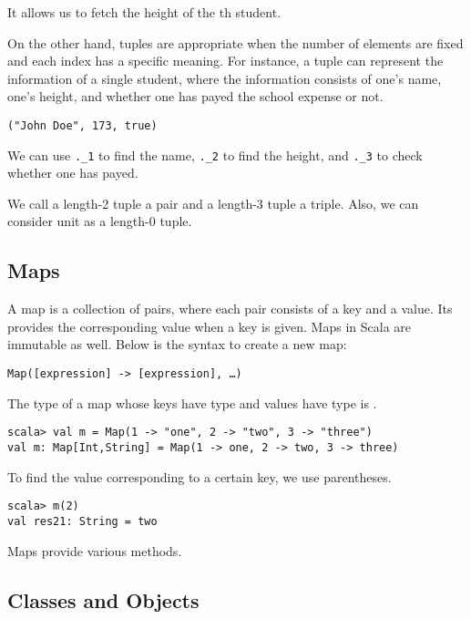 It allows us to fetch the height of the th student.

On the other hand, tuples are appropriate when the number of elements
are fixed and each index has a specific meaning. For instance,
a tuple can represent the information of a single student, where the information
consists of one's name, one's height, and whether one has payed the school
expense or not.

\begin{verbatim}
("John Doe", 173, true)
\end{verbatim}

We can use \verb+._1+ to find the name, \verb+._2+ to find the height, and
\verb+._3+ to check whether one has payed.

We call a length-2 tuple a pair and a length-3 tuple a triple. Also, we can
consider unit as a length-0 tuple.

\subsection{Maps}

A map is a collection of pairs, where each pair consists of a key and a value.
Its provides the corresponding value when a key is given.
Maps in Scala are immutable as well. Below is the syntax to create a new map:

\begin{verbatim}
Map([expression] -> [expression], …)
\end{verbatim}

The type of a map whose keys have type  and values have type  is
.

\begin{verbatim}
scala> val m = Map(1 -> "one", 2 -> "two", 3 -> "three")
val m: Map[Int,String] = Map(1 -> one, 2 -> two, 3 -> three)
\end{verbatim}

To find the value corresponding to a certain key, we use parentheses.

\begin{verbatim}
scala> m(2)
val res21: String = two
\end{verbatim}

Maps provide various
methods.

\subsection{Classes and Objects}

